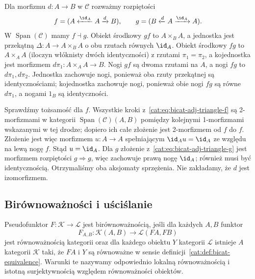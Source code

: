 \begin{przyklad}\label{cat:ex:span-adjunction}
Dla morfizmu $d:A\to B$ w $\mathcal C$ rozważmy rozpiętości
\[
 f=(A\xleftarrow{\id_A}A\xrightarrow{d}B),\qquad
 g=(B\xleftarrow{d}A\xrightarrow{\id_A}A).
\]
W $\operatorname{Span}(\mathcal C)$ mamy $f\dashv g$. Obiekt środkowy $gf$ to $A\times_B A$, a jednostka jest przekątną $\Delta:A\to A\times_B A$ o obu rzutach równych $\id_A$. Obiekt środkowy $fg$ to $A\times_A A$ (iloczyn włóknisty dwóch identyczności) z rzutami $\pi_1=\pi_2$, a kojednostka jest morfizmem $d\pi_1:A\times_A A\to B$. Nogi $gf$ są dwoma rzutami na $A$, a nogi $fg$ to $d\pi_1,d\pi_2$. Jednostka zachowuje nogi, ponieważ oba rzuty przekątnej są identycznościami; kojednostka zachowuje nogi, ponieważ obie nogi $fg$ są równe $d\pi_1$, a nogami $1_B$ są identyczności.

Sprawdźmy tożsamość dla $f$. Wszystkie kroki z~\eqref{cat:eq:bicat-adj-triangle-f} są 2-morfizmami w kategorii $\operatorname{Span}(\mathcal C)(A,B)$ pomiędzy kolejnymi 1-morfizmami wskazanymi w tej drodze; dopiero ich całe złożenie jest 2-morfizmem od $f$ do $f$. Złożenie jest więc morfizmem $u:A\to A$ spełniającym $\id_Au=\id_A$ ze względu na lewą nogę $f$. Stąd $u=\id_A$. Dla $g$ złożenie z~\eqref{cat:eq:bicat-adj-triangle-g} jest morfizmem rozpiętości $g\Rightarrow g$, więc zachowuje prawą nogę $\id_A$; również musi być identycznością. Otrzymaliśmy oba aksjomaty sprzężenia. Nie zakładamy, że $d$ jest izomorfizmem.
\end{przyklad}

\subsection{Birównoważności i uściślanie}

\begin{definicja}[Birównoważność]\label{cat:def:biequivalence}
Pseudofunktor $F:\mathcal K\to\mathcal L$ jest birównoważnością, jeśli dla każdych $A,B$ funktor
\[
 F_{A,B}:\mathcal K(A,B)\to\mathcal L(FA,FB)
\]
jest równoważnością kategorii oraz dla każdego obiektu $Y$ kategorii $\mathcal L$ istnieje $A$ kategorii $\mathcal K$ taki, że $FA$ i $Y$ są równoważne w sensie definicji~\ref{cat:def:bicat-equivalence}. Warunki te nazywamy odpowiednio lokalną równoważnością i istotną surjektywnością względem równoważności obiektów.
\end{definicja}

